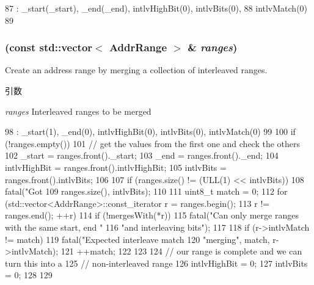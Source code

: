 \begin{DoxyCode}
87         : _start(_start), _end(_end), intlvHighBit(0), intlvBits(0),
88           intlvMatch(0)
89     {}
\end{DoxyCode}
\hypertarget{classAddrRange_a3f7bd25bb87bb07a17105ecfe3a41804}{
\subsubsection[{AddrRange}]{ (const {\bf std::vector}$<$ {\bf AddrRange} $>$ \& {\em ranges})}}
\label{classAddrRange_a3f7bd25bb87bb07a17105ecfe3a41804}
Create an address range by merging a collection of interleaved ranges.


\begin{DoxyParams}{引数}
\item[{\em ranges}]Interleaved ranges to be merged \end{DoxyParams}



\begin{DoxyCode}
98         : _start(1), _end(0), intlvHighBit(0), intlvBits(0), intlvMatch(0)
99     {
100         if (!ranges.empty()) {
101             // get the values from the first one and check the others
102             _start = ranges.front()._start;
103             _end = ranges.front()._end;
104             intlvHighBit = ranges.front().intlvHighBit;
105             intlvBits = ranges.front().intlvBits;
106 
107             if (ranges.size() != (ULL(1) << intlvBits))
108                 fatal("Got %
109                       ranges.size(), intlvBits);
110 
111             uint8_t match = 0;
112             for (std::vector<AddrRange>::const_iterator r = ranges.begin();
113                  r != ranges.end(); ++r) {
114                 if (!mergesWith(*r))
115                     fatal("Can only merge ranges with the same start, end "
116                           "and interleaving bits\n");
117 
118                 if (r->intlvMatch != match)
119                     fatal("Expected interleave match %
120                           "merging\n", match, r->intlvMatch);
121                 ++match;
122             }
123 
124             // our range is complete and we can turn this into a
125             // non-interleaved range
126             intlvHighBit = 0;
127             intlvBits = 0;
128         }
129     }
\end{DoxyCode}


